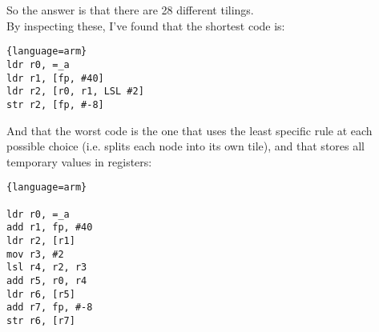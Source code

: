 \\
\\
So the answer is that there are 28 different tilings. \\

By inspecting these, I've found that the shortest code is:

\begin{lstlisting}{language=arm}
ldr r0, =_a
ldr r1, [fp, #40]
ldr r2, [r0, r1, LSL #2]
str r2, [fp, #-8]
\end{lstlisting}

And that the worst code is the one that uses the least specific rule at each possible choice (i.e. splits each node into its own tile), and that stores all temporary values in registers:

\begin{lstlisting}{language=arm}

ldr r0, =_a
add r1, fp, #40
ldr r2, [r1]
mov r3, #2
lsl r4, r2, r3
add r5, r0, r4
ldr r6, [r5]
add r7, fp, #-8
str r6, [r7]
\end{lstlisting}
